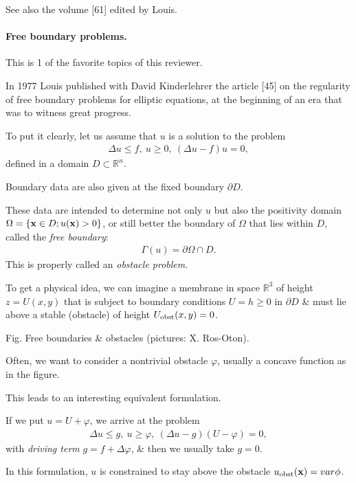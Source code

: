 \documentclass{article}
\begin{document}
See also the volume [61] edited by Louis.

\paragraph{Free boundary problems.} This is 1 of the favorite topics of this reviewer.

In 1977 Louis published with David Kinderlehrer the article [45] on the regularity of free boundary problems for elliptic equations, at the beginning of an era that was to witness great progress.

To put it clearly, let us assume that $u$ is a solution to the problem
\begin{align*}
	\Delta u\le f,\ u\ge 0,\ (\Delta u - f)u = 0,
\end{align*}
defined in a domain $D\subset\mathbb{R}^n$.

Boundary data are also given at the fixed boundary $\partial D$.

These data are intended to determine not only $u$ but also the positivity domain $\Omega = \{{\bf x}\in D;u({\bf x}) > 0\}$, or still better the boundary of $\Omega$ that lies within $D$, called the \textit{free boundary}:
\begin{align*}
	\Gamma(u) = \partial\Omega\cap D.
\end{align*}
This is properly called an \textit{obstacle problem}.

To get a physical idea, we can imagine a membrane in space $\mathbb{R}^3$ of height $z = U(x,y)$ that is subject to boundary conditions $U = h\ge 0$ in $\partial D$ \& must lie above a stable (obstacle) of height $U_{\rm obst}(x,y) = 0$.

\textsf{Fig. Free boundaries \& obstacles (pictures: X. Ros-Oton).}

%
Often, we want to consider a nontrivial obstacle $\varphi$, usually a concave function as in the figure.

This leads to an interesting equivalent formulation.

If we put $u = U + \varphi$, we arrive at the problem
\begin{align*}
	\Delta u\le g,\ u\ge\varphi,\ (\Delta u - g)(U - \varphi) = 0,
\end{align*}
with \textit{driving term} $g = f + \Delta\varphi$, \& then we usually take $g = 0$.

In this formulation, $u$ is constrained to stay above the obstacle $u_{\rm obst}({\bf x}) = var\phi$.
\end{document}
